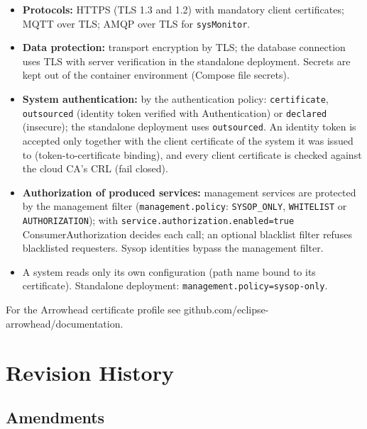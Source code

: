 \documentclass[a4paper]{arrowhead}
\begin{document}
\begin{itemize}
  \item \textbf{Protocols:} HTTPS (TLS 1.3 and 1.2) with mandatory client certificates; MQTT over TLS; AMQP over TLS for \texttt{sysMonitor}.
  \item \textbf{Data protection:} transport encryption by TLS; the database connection uses TLS with server verification in the standalone deployment. Secrets are kept out of the container environment (Compose file secrets).
  \item \textbf{System authentication:} by the authentication policy: \texttt{certificate}, \texttt{outsourced} (identity token verified with Authentication) or \texttt{declared} (insecure); the standalone deployment uses \texttt{outsourced}. An identity token is accepted only together with the client certificate of the system it was issued to (token-to-certificate binding), and every client certificate is checked against the cloud CA's CRL (fail closed).
  \item \textbf{Authorization of produced services:} management services are protected by the management filter (\texttt{management.policy}: \texttt{SYSOP\_ONLY}, \texttt{WHITELIST} or \texttt{AUTHORIZATION}); with \texttt{service.authorization.enabled=true} ConsumerAuthorization decides each call; an optional blacklist filter refuses blacklisted requesters. Sysop identities bypass the management filter.
  \item A system reads only its own configuration (path name bound to its certificate). Standalone deployment: \texttt{management.\allowbreak{}policy=\allowbreak{}sysop-\allowbreak{}only}.
\end{itemize}

For the Arrowhead certificate profile see github.com/eclipse-arrowhead/documentation.





\newpage

\section{Revision History}
\subsection{Amendments}
\end{document}

